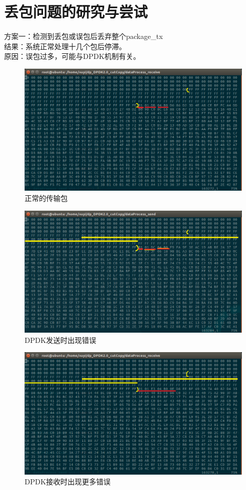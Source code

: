 \documentclass{article}
\begin{document}
\section{丢包问题的研究与尝试}
方案一：检测到丢包或误包后丢弃整个package\_tx \\
结果：系统正常处理十几个包后停滞。\\
原因：误包过多，可能与DPDK机制有关。\\
\begin{figure}[H]
	\centering
	\includegraphics[width = .8\textwidth]{data_right.png}
	\caption{正常的传输包}
\end{figure}
\begin{figure}[H]
	\centering
	\includegraphics[width = .8\textwidth]{data_send.png}
	\caption{DPDK发送时出现错误}
\end{figure}
\begin{figure}[H]
	\centering
	\includegraphics[width = .8\textwidth]{data_receive.png}
	\caption{DPDK接收时出现更多错误}
\end{figure}
\end{document}
